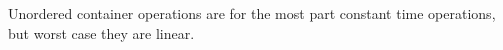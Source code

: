 \documentclass{report}
\begin{document}
   \bigbreak \noindent 
   Unordered container operations are for the most part constant time operations, but worst case they are linear.











\end{document}
